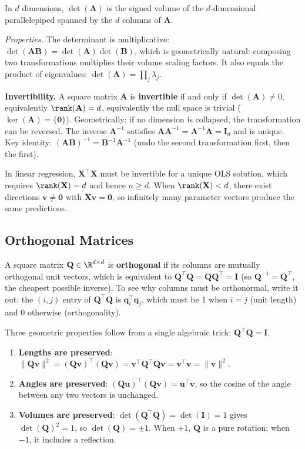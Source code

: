 \documentclass[main.tex]{subfiles}
\begin{document}
In $d$ dimensions, $\det(\mathbf{A})$ is the signed volume of the $d$-dimensional parallelepiped spanned by the $d$ columns of $\mathbf{A}$.

\textit{Properties.} The determinant is multiplicative: $\det(\mathbf{A}\mathbf{B}) = \det(\mathbf{A})\det(\mathbf{B})$, which is geometrically natural: composing two transformations multiplies their volume scaling factors. It also equals the product of eigenvalues: $\det(\mathbf{A}) = \prod_j \lambda_j$.

\textbf{Invertibility.} A square matrix $\mathbf{A}$ is \textbf{invertible} if and only if $\det(\mathbf{A}) \neq 0$, equivalently $\rank(\mathbf{A}) = d$, equivalently the null space is trivial ($\ker(\mathbf{A}) = \{\mathbf{0}\}$). Geometrically: if no dimension is collapsed, the transformation can be reversed. The inverse $\mathbf{A}^{-1}$ satisfies $\mathbf{A}\mathbf{A}^{-1} = \mathbf{A}^{-1}\mathbf{A} = \mathbf{I}_d$ and is unique. Key identity: $(\mathbf{A}\mathbf{B})^{-1} = \mathbf{B}^{-1}\mathbf{A}^{-1}$ (undo the second transformation first, then the first).

In linear regression, $\mathbf{X}^\top\mathbf{X}$ must be invertible for a unique OLS solution, which requires $\rank(\mathbf{X}) = d$ and hence $n \geq d$. When $\rank(\mathbf{X}) < d$, there exist directions $\mathbf{v} \neq \mathbf{0}$ with $\mathbf{X}\mathbf{v} = \mathbf{0}$, so infinitely many parameter vectors produce the same predictions.

\subsection{Orthogonal Matrices}

A square matrix $\mathbf{Q} \in \R^{d \times d}$ is \textbf{orthogonal} if its columns are mutually orthogonal unit vectors, which is equivalent to $\mathbf{Q}^\top\mathbf{Q} = \mathbf{Q}\mathbf{Q}^\top = \mathbf{I}$ (so $\mathbf{Q}^{-1} = \mathbf{Q}^\top$, the cheapest possible inverse). To see why columns must be orthonormal, write it out: the $(i,j)$ entry of $\mathbf{Q}^\top\mathbf{Q}$ is $\mathbf{q}_i^\top\mathbf{q}_j$, which must be 1 when $i = j$ (unit length) and 0 otherwise (orthogonality).

Three geometric properties follow from a single algebraic trick: $\mathbf{Q}^\top\mathbf{Q} = \mathbf{I}$.
\begin{enumerate}
    \item \textbf{Lengths are preserved}: $\|\mathbf{Q}\mathbf{v}\|^2 = (\mathbf{Q}\mathbf{v})^\top(\mathbf{Q}\mathbf{v}) = \mathbf{v}^\top\mathbf{Q}^\top\mathbf{Q}\mathbf{v} = \mathbf{v}^\top\mathbf{v} = \|\mathbf{v}\|^2$.
    \item \textbf{Angles are preserved}: $(\mathbf{Q}\mathbf{u})^\top(\mathbf{Q}\mathbf{v}) = \mathbf{u}^\top\mathbf{v}$, so the cosine of the angle between any two vectors is unchanged.
    \item \textbf{Volumes are preserved}: $\det(\mathbf{Q}^\top\mathbf{Q}) = \det(\mathbf{I}) = 1$ gives $\det(\mathbf{Q})^2 = 1$, so $\det(\mathbf{Q}) = \pm 1$. When $+1$, $\mathbf{Q}$ is a pure rotation; when $-1$, it includes a reflection.
\end{enumerate}
\end{document}
